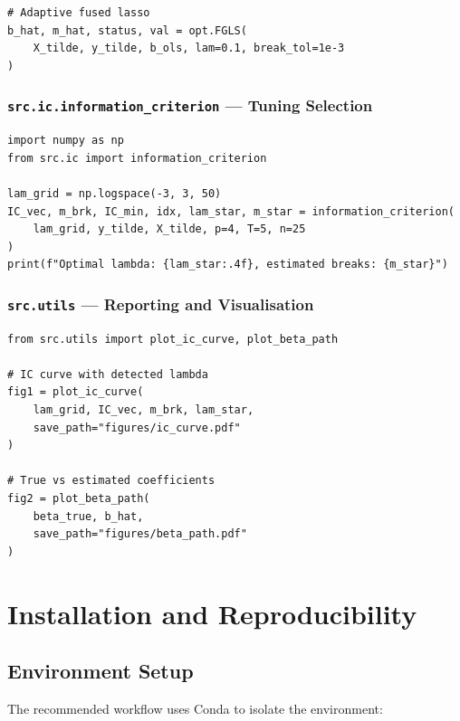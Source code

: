\documentclass[12pt, a4paper]{article}
\theoremstyle{plain}
\theoremstyle{definition}
\theoremstyle{remark}
\begin{document}
\begin{onehalfspacing}
\begin{lstlisting}[caption={Using the Optimize class.}]
# Adaptive fused lasso
b_hat, m_hat, status, val = opt.FGLS(
    X_tilde, y_tilde, b_ols, lam=0.1, break_tol=1e-3
)
\end{lstlisting}

\subsubsection{\texttt{src.ic.information\_criterion} — Tuning Selection}

\begin{lstlisting}[caption={IC-based selection of the regularisation parameter.}]
import numpy as np
from src.ic import information_criterion

lam_grid = np.logspace(-3, 3, 50)
IC_vec, m_brk, IC_min, idx, lam_star, m_star = information_criterion(
    lam_grid, y_tilde, X_tilde, p=4, T=5, n=25
)
print(f"Optimal lambda: {lam_star:.4f}, estimated breaks: {m_star}")
\end{lstlisting}

\subsubsection{\texttt{src.utils} — Reporting and Visualisation}

\begin{lstlisting}[caption={Generating diagnostic plots.}]
from src.utils import plot_ic_curve, plot_beta_path

# IC curve with detected lambda
fig1 = plot_ic_curve(
    lam_grid, IC_vec, m_brk, lam_star,
    save_path="figures/ic_curve.pdf"
)

# True vs estimated coefficients
fig2 = plot_beta_path(
    beta_true, b_hat,
    save_path="figures/beta_path.pdf"
)
\end{lstlisting}

\section{Installation and Reproducibility}
\label{sec:install}

\subsection{Environment Setup}

The recommended workflow uses Conda to isolate the environment:


\end{onehalfspacing}
\end{document}
